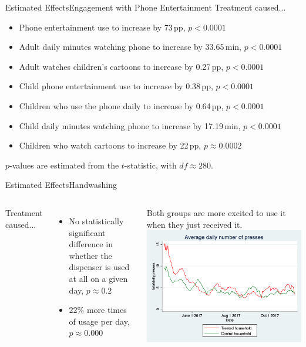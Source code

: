 \documentclass[aspectratio=169]{beamer}
\begin{document}
\begin{frame}{Estimated Effects}{Engagement with Phone Entertainment}
	Treatment caused...
	\begin{itemize}
		\item Phone entertainment use to increase by 73\,pp, $p < 0.0001$
		\item Adult daily minutes watching phone to increase by 33.65\,min, $p < 0.0001$
		\item Adult watches children's cartoons to increase by 0.27\,pp, $p < 0.0001$
		\item Child phone entertainment use to increase by 0.38\,pp, $p < 0.0001$
		\item Children who use the phone daily to increase by 0.64\,pp, $p < 0.0001$
		\item Child daily minutes watching phone to increase by 17.19\,min, $p < 0.0001$
		\item Children who watch cartoons to increase by 22\,pp, $p \approx 0.0002$
	\end{itemize}

	$p$-values are estimated from the $t$-statistic, with $df \approx 280$.
\end{frame}

\begin{frame}{Estimated Effects}{Handwashing}
	\begin{columns}
	Treatment caused...
	\begin{itemize}
		\item No statistically significant difference in whether the dispenser is used at all on a given day, $p \approx 0.2$
		\item 22\% more times of usage per day, $p \approx 0.000$
	\end{itemize}
	Both groups are more excited to use it when they just received it.
	\includegraphics[width=\linewidth]{img-000.png}
	\end{columns}
\end{frame}
\end{document}
